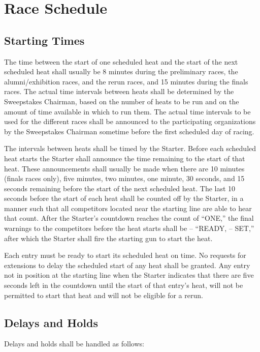 \documentclass[openany]{book}
\begin{document}
\section{Race Schedule}

\subsection{Starting Times}

The time between the start of one scheduled heat and the start of the next scheduled heat shall usually be 8 minutes during the preliminary races, the alumni/exhibition races, and the rerun races, and 15 minutes during the finals races. The actual time intervals between heats shall be determined by the Sweepstakes Chairman, based on the number of heats to be run and on the amount of time available in which to run them. The actual time intervals to be used for the different races shall be announced to the participating organizations by the Sweepstakes Chairman sometime before the first scheduled day of racing.

The intervals between heats shall be timed by the Starter. Before each scheduled heat starts the Starter shall announce the time remaining to the start of that heat. These announcements shall usually be made when there are 10 minutes (finals races only), five minutes, two minutes, one minute, 30 seconds, and 15 seconds remaining before the start of the next scheduled heat. The last 10 seconds before the start of each heat shall be counted off by the Starter, in a manner such that all competitors located near the starting line are able to hear that count. After the Starter's countdown reaches the count of ``ONE,'' the final warnings to the competitors before the heat starts shall be -- ``READY, -- SET,'' after which the Starter shall fire the starting gun to start the heat.

Each entry must be ready to start its scheduled heat on time. No requests for extensions to delay the scheduled start of any heat shall be granted. Any entry not in position at the starting line when the Starter indicates that there are five seconds left in the countdown until the start of that entry's heat, will not be permitted to start that heat and will not be eligible for a rerun.

\subsection{Delays and Holds}

Delays and holds shall be handled as follows:
\end{document}
